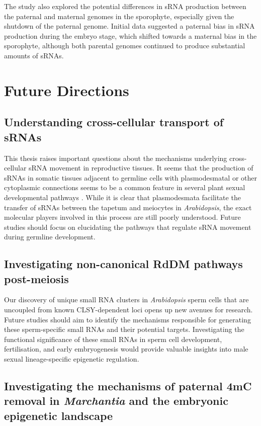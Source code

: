 The study also explored the potential differences in sRNA production between the paternal and maternal genomes in the sporophyte, especially given the shutdown of the paternal genome. Initial data suggested a paternal bias in sRNA production during the embryo stage, which shifted towards a maternal bias in the sporophyte, although both parental genomes continued to produce substantial amounts of sRNAs.

\section{Future Directions}

\subsection{Understanding cross-cellular transport of sRNAs}

This thesis raises important questions about the mechanisms underlying cross-cellular sRNA movement in reproductive tissues. It seems that the production of sRNAs in somatic tissues adjacent to germline cells with plasmodesmatal or other cytoplasmic connections seems to be a common feature in several plant sexual developmental pathways \cite{RN187,RN293,RN57,RN235}. While it is clear that plasmodesmata facilitate the transfer of sRNAs between the tapetum and meiocytes in \textit{Arabidopsis}, the exact molecular players involved in this process are still poorly understood. Future studies should focus on elucidating the pathways that regulate sRNA movement during germline development.

\subsection{Investigating non-canonical RdDM pathways post-meiosis}

Our discovery of unique small RNA clusters in \textit{Arabidopsis} sperm cells that are uncoupled from known CLSY-dependent loci opens up new avenues for research. Future studies should aim to identify the mechanisms responsible for generating these sperm-specific small RNAs and their potential targets. Investigating the functional significance of these small RNAs in sperm cell development, fertilisation, and early embryogenesis would provide valuable insights into male sexual lineage-specific epigenetic regulation.

\subsection{Investigating the mechanisms of paternal 4mC removal in \textit{Marchantia} and the embryonic epigenetic landscape}

